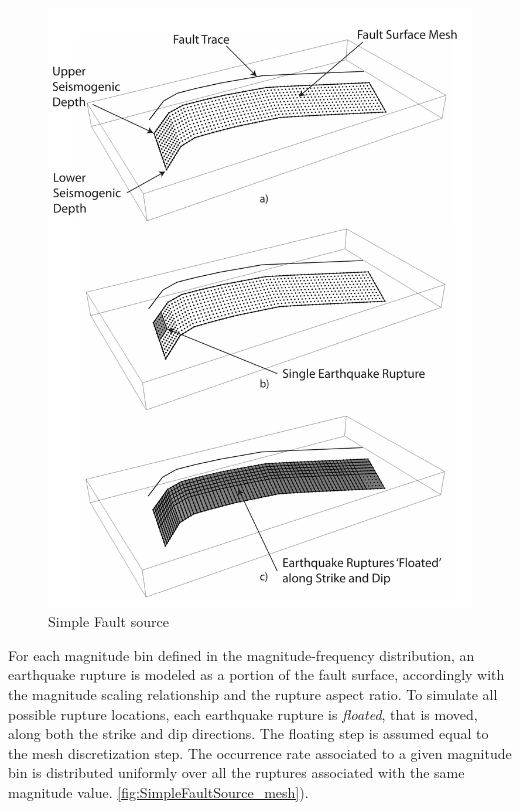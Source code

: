 \begin{figure}
\centering
\includegraphics[width=14cm]{./Pictures/SimpleFaultSource.pdf}
\caption{Simple Fault source}
\label{fig:SimpleFaultSource}
\end{figure}
For each magnitude bin defined in the magnitude-frequency distribution, an earthquake rupture is modeled as a portion of the fault surface, accordingly with the magnitude scaling relationship and the rupture aspect
ratio. To simulate all possible rupture locations, each earthquake rupture is \textit{floated}, that is moved,
along both the strike and dip directions. The floating step is assumed equal to the mesh discretization step.
The occurrence rate associated to a given magnitude bin is distributed uniformly over all the ruptures associated with the same magnitude value. 
\ref{fig:SimpleFaultSource_mesh}).

